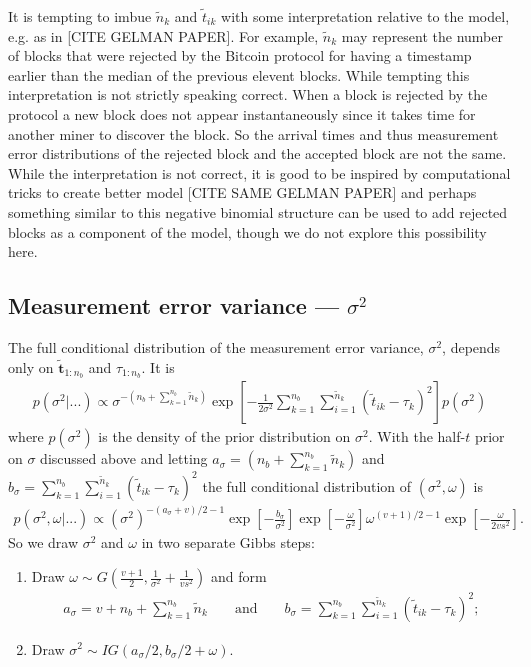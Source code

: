 \documentclass{article}
\begin{document}
It is tempting to imbue $\widetilde{n}_k$ and $\widetilde{t}_{ik}$ with some interpretation relative to the model, e.g. as in [CITE GELMAN PAPER]. For example, $\widetilde{n}_k$ may represent the number of blocks that were rejected by the Bitcoin protocol for having a timestamp earlier than the median of the previous elevent blocks. While tempting this interpretation is not strictly speaking correct. When a block is rejected by the protocol a new block does not appear instantaneously since it takes time for another miner to discover the block. So the arrival times and thus measurement error distributions of the rejected block and the accepted block are not the same. While the interpretation is not correct, it is good to be inspired by computational tricks to create better model [CITE SAME GELMAN PAPER] and perhaps something similar to this negative binomial structure can be used to add rejected blocks as a component of the model, though we do not explore this possibility here.

\subsection{Measurement error variance --- $\sigma^2$}
The full conditional distribution of the measurement error variance, $\sigma^2$, depends only on $\widetilde{\bm{t}}_{1:n_{b}}$ and $\tau_{1:n_{b}}$. It is
\begin{align*}
p(\sigma^2|...) \propto \sigma^{-(n_{b} + \sum_{k=1}^{n_{b}}\widetilde{n}_k)}\exp\left[-\frac{1}{2\sigma^2}\sum_{k=1}^{n_{b}}\sum_{i=1}^{\widetilde{n}_k}(\widetilde{t}_{ik} - \tau_k)^2\right]p(\sigma^2)
\end{align*}
where $p(\sigma^2)$ is the density of the prior distribution on $\sigma^2$. With the half-$t$ prior on $\sigma$ discussed above and letting $a_\sigma = (n_{b} + \sum_{k=1}^{n_b}\widetilde{n}_k)$ and $b_\sigma = \sum_{k=1}^{n_{b}}\sum_{i=1}^{\widetilde{n}_k}(\widetilde{t}_{ik} - \tau_k)^2$ the full conditional distribution of $(\sigma^2,\omega)$ is
\begin{align*}
p(\sigma^2,\omega|...) \propto (\sigma^2)^{-(a_\sigma+v)/2-1}\exp\left[-\frac{b_\sigma}{\sigma^2}\right]\exp\left[-\frac{\omega}{\sigma^2}\right]\omega^{(v + 1)/2 - 1}\exp\left[-\frac{\omega}{2 v s^2}\right].
\end{align*}
So we draw $\sigma^2$ and $\omega$ in two separate Gibbs steps:
\begin{enumerate}
\item Draw $\omega \sim G\left(\frac{v + 1}{2}, \frac{1}{\sigma^2} + \frac{1}{v s^2}\right)$ and form
\begin{align*}
a_\sigma = v + n_{b} + \sum_{k=1}^{n_b}\widetilde{n}_k &&\mbox{  and  }&& b_\sigma = \sum_{k=1}^{n_{b}}\sum_{i=1}^{\widetilde{n}_k}(\widetilde{t}_{ik} - \tau_k)^2;
\end{align*}
\item Draw $\sigma^2 \sim  IG\left(a_\sigma/2, b_\sigma/2 + \omega\right)$.
\end{enumerate}
\end{document}
